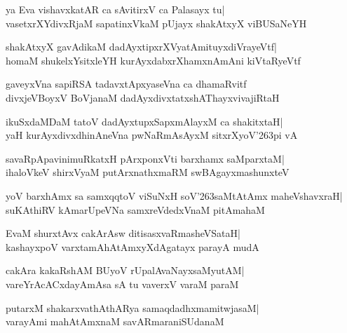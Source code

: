 \documentclass[twoside,12pt,openright]{book}
\def\S{\char'263}
\newcounter{shloka}[chapter]
\begin{document}
\begin{shloka}%
ya Eva vishavxkatAR ca sAvitirxV ca Palasayx tu|\\
vasetxrXYdivxRjaM sapatinxVkaM pUjayx shakAtxyX viBUSaNeYH
\end{shloka}

\begin{shloka}%
shakAtxyX gavAdikaM dadAyxtipxrXVyatAmituyxdiVrayeVtf|\\
homaM shukelxYsitxleYH kurAyxdabxrXhamxnAmAni kiVtaRyeVtf
\end{shloka}

\begin{shloka}%
gaveyxVna sapiRSA tadavxtApxyaseVna ca dhamaRvitf\\
divxjeVBoyxV BoVjanaM dadAyxdivxtatxshAThayxvivajiRtaH
\end{shloka}

\begin{shloka}%
ikuSxdaMDaM tatoV dadAyxtupxSapxmAlayxM ca shakitxtaH|\\
yaH kurAyxdivxdhinAneVna pwNaRmAsAyxM sitxrXyoV\S pi vA
\end{shloka}

\begin{shloka}%
savaRpApavinimuRkatxH pArxponxVti barxhamx saMparxtaM|\\
ihaloVkeV shirxVyaM putArxnathxmaRM swBAgayxmashunxteV
\end{shloka}

\begin{shloka}%
yoV barxhAmx sa samxqqtoV viSuNxH soV\S saMtAtAmx maheVshavxraH|\\
suKAthiRV kAmarUpeVNa samxreVdedxVnaM pitAmahaM
\end{shloka}

\begin{shloka}%
EvaM shurxtAvx cakArAsw ditisasxvaRmasheVSataH|\\
kashayxpoV varxtamAhAtAmxyXdAgatayx parayA mudA
\end{shloka}

\begin{shloka}%
cakAra kakaRshAM BUyoV rUpalAvaNayxsaMyutAM|\\
vareYrAcACxdayAmAsa sA tu vaverxV varaM paraM
\end{shloka}

\begin{shloka}%
putarxM shakarxvathAthARya samaqdadhxmamitwjasaM|\\
varayAmi mahAtAmxnaM savARmaraniSUdanaM
\end{shloka}
\end{document}
